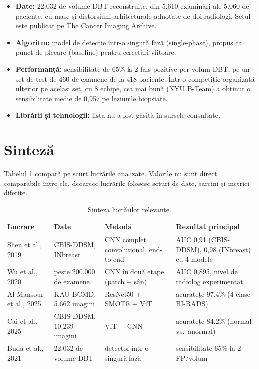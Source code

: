 \documentclass[runningheads,a4paper,11pt]{report}
\begin{document}
\begin{itemize}
	\item \textbf{Date:} 22.032 de volume DBT reconstruite, din 5.610 examinări ale 5.060 de paciente, cu mase și distorsiuni arhitecturale adnotate de doi radiologi. Setul este publicat pe The Cancer Imaging Archive.
	\item \textbf{Algoritm:} model de detecție într-o singură fază (single-phase), propus ca punct de plecare (baseline) pentru cercetări viitoare.
	\item \textbf{Performanță:} sensibilitate de 65\% la 2 fals pozitive per volum DBT, pe un set de test de 460 de examene de la 418 paciente. Într-o competiție organizată ulterior pe același set, cu 8 echipe, cea mai bună (NYU B-Team) a obținut o sensibilitate medie de 0,957 pe leziunile biopsiate.
	\item \textbf{Librării și tehnologii:} lista nu a fost găsită în sursele consultate.
\end{itemize}

\section{Sinteză}
\label{section:synthesis}

Tabelul \ref{tab:related} compară pe scurt lucrările analizate. Valorile nu sunt direct comparabile între ele, deoarece lucrările folosesc seturi de date, sarcini și metrici diferite.

\begin{table}[htbp]
	\caption{Sinteza lucrărilor relevante.}
	\label{tab:related}
	\begin{center}
		\begin{tabular}{p{2.6cm}p{3.6cm}p{4.2cm}p{4.2cm}}
			\textbf{Lucrare} & \textbf{Date} & \textbf{Metodă} & \textbf{Rezultat principal} \\
			\hline\hline
			Shen et al., 2019 & CBIS-DDSM, INbreast & CNN complet convoluțional, end-to-end & AUC 0,91 (CBIS-DDSM), 0,98 (INbreast) cu 4 modele \\
			Wu et al., 2020 & peste 200.000 de examene & CNN în două etape (patch + sân) & AUC 0,895, nivel de radiolog experimentat \\
			Al Mansour et al., 2025 & KAU-BCMD, 5.662 imagini & ResNet50 + SMOTE + ViT & acuratețe 97,4\% (4 clase BI-RADS) \\
			Cai et al., 2025 & CBIS-DDSM, 10.239 imagini & ViT + GNN & acuratețe 84,2\% (normal vs.\ anormal) \\
			Buda et al., 2021 & 22.032 de volume DBT & detector într-o singură fază & sensibilitate 65\% la 2 FP/volum \\
		\end{tabular}
	\end{center}
\end{table}
\end{document}
